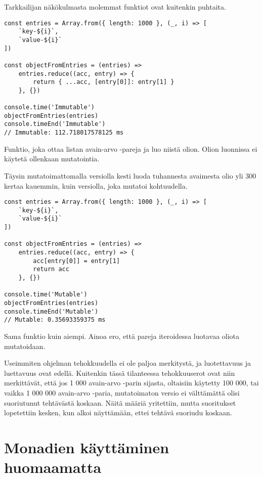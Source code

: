 Tarkkailijan näkökulmasta molemmat funktiot ovat kuitenkin puhtaita.

\begin{code}
    \begin{verbatim}
const entries = Array.from({ length: 1000 }, (_, i) => [
    `key-${i}`,
    `value-${i}`
])

const objectFromEntries = (entries) =>
    entries.reduce((acc, entry) => {
        return { ...acc, [entry[0]]: entry[1] }
    }, {})

console.time('Immutable')
objectFromEntries(entries)
console.timeEnd('Immutable')
// Immutable: 112.718017578125 ms
\end{verbatim}
    \caption{Funktio, joka ottaa listan avain-arvo -pareja ja luo niistä olion. Olion luonnissa ei käytetä ollenkaan mutatointia.}
    \label{code:js_just_mutate_immutable}
\end{code}

Täysin mutatoimattomalla versiolla kesti luoda tuhannesta avaimesta olio yli 300 kertaa kauemmin, kuin versiolla, joka mutatoi kohtuudella.


\begin{code}
    \begin{verbatim}
const entries = Array.from({ length: 1000 }, (_, i) => [
    `key-${i}`,
    `value-${i}`
])

const objectFromEntries = (entries) =>
    entries.reduce((acc, entry) => {
        acc[entry[0]] = entry[1]
        return acc
    }, {})
          
console.time('Mutable')
objectFromEntries(entries)
console.timeEnd('Mutable')
// Mutable: 0.35693359375 ms
\end{verbatim}
    \caption{Sama funktio kuin aiempi. Ainoa ero, että pareja iteroidessa luotavaa oliota mutatoidaan.}
    \label{code:js_just_mutate_mutable}
\end{code}

Useimmiten ohjelman tehokkuudella ei ole paljoa merkitystä, ja luotettavuus ja luettavuus ovat edellä. Kuitenkin tässä tilanteessa tehokkuuserot ovat niin merkittävät, että jos 1 000 avain-arvo -parin sijasta, oltaisiin käytetty 100 000, tai vaikka 1 000 000 avain-arvo -paria, mutatoimaton versio ei välttämättä olisi suoriutunut tehtävästä koskaan. Näitä määriä yritettiin, mutta suoritukset lopetettiin kesken, kun alkoi näyttämään, ettei tehtävä suoriudu koskaan.


\section{Monadien käyttäminen huomaamatta}

